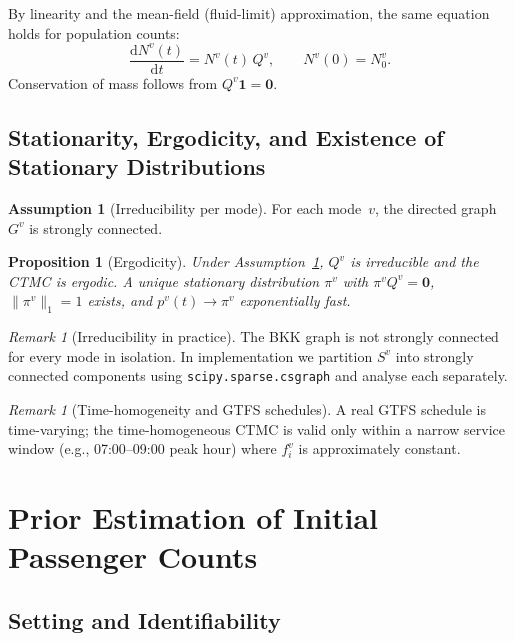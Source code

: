 \documentclass[11pt,a4paper]{article}
\theoremstyle{plain}
\newtheorem{proposition}[theorem]{Proposition}
\theoremstyle{definition}
\newtheorem{assumption}[theorem]{Assumption}
\theoremstyle{remark}
\newtheorem{remark}[theorem]{Remark}
\begin{document}
By linearity and the mean-field (fluid-limit) approximation, the same equation
holds for population counts:
\begin{equation}
  \frac{\mathrm{d}N^v(t)}{\mathrm{d}t} = N^v(t)\,Q^v,\qquad
  N^v(0)=N^v_0.\label{eq:kfe-pop}
\end{equation}
Conservation of mass follows from $Q^v\mathbf{1}=\mathbf{0}$.

\subsection{Stationarity, Ergodicity, and Existence of Stationary Distributions}

\begin{assumption}[Irreducibility per mode]
\label{ass:irreducible}
For each mode~$v$, the directed graph~$G^v$ is strongly connected.
\end{assumption}

\begin{proposition}[Ergodicity]
Under Assumption~\ref{ass:irreducible}, $Q^v$ is irreducible and the CTMC is
ergodic.  A unique stationary distribution $\pi^v$ with $\pi^v Q^v=\mathbf{0}$,
$\|\pi^v\|_1=1$ exists, and $p^v(t)\to\pi^v$ exponentially fast.
\end{proposition}

\begin{remark}[Irreducibility in practice]
The BKK graph is not strongly connected for every mode in isolation.  In
implementation we partition $S^v$ into strongly connected components using
\texttt{scipy.sparse.csgraph} and analyse each separately.
\end{remark}

\begin{remark}[Time-homogeneity and GTFS schedules]
A real GTFS schedule is time-varying; the time-homogeneous CTMC is valid only
within a narrow service window (e.g., 07:00--09:00 peak hour) where $f^v_i$
is approximately constant.
\end{remark}

\section{Prior Estimation of Initial Passenger Counts}
\label{sec:prior}

\subsection{Setting and Identifiability}
\end{document}
